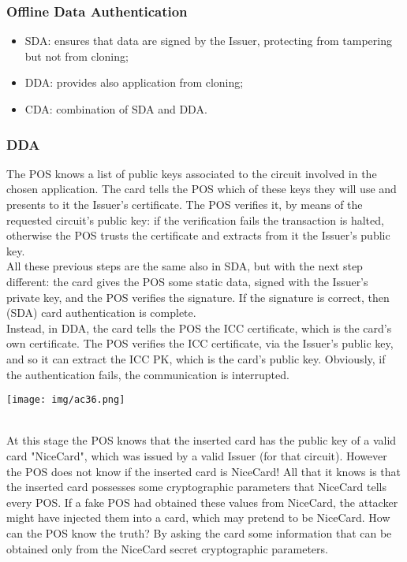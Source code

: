 \documentclass[a4paper, 10pt, titlepage]{article}
\begin{document}
\subsubsection{Offline Data Authentication}
\begin{itemize}
\item SDA: ensures that data are signed by the Issuer, protecting from tampering but not from cloning;
\item DDA: provides also application from cloning;
\item CDA: combination of SDA and DDA.
\end{itemize}

\subsubsection*{DDA}
\begin{minipage}{0.5\textwidth}
The POS knows a list of public keys associated to the circuit involved in the chosen application. The card tells the POS which of these keys they will use and presents to it the Issuer's certificate.
The POS verifies it, by means of the requested circuit's public key: if the verification fails the transaction is halted, otherwise the POS trusts the certificate and extracts from it the Issuer's public key. \\
All these previous steps are the same also in SDA, but with the next step different: the card gives the POS some static data, signed with the Issuer's private key, and the POS verifies the signature. If the signature is correct, then (SDA) card authentication is complete. \\
Instead, in DDA, the card tells the POS the ICC certificate, which is the card's own certificate. The POS verifies the ICC certificate, via the Issuer's public key, and so it can extract the ICC PK, which is the card's public key. Obviously, if the authentication fails, the communication is interrupted.
\end{minipage}
\hfill
\begin{minipage}{0.4\textwidth}
\begin{center}
\texttt{[image: img/ac36.png]}
\end{center}
\end{minipage} \medskip\\
At this stage the POS knows that the inserted card has the public key of a valid card "NiceCard", which was issued by a valid Issuer (for that circuit).
However the POS does not know if the inserted card is NiceCard! All that it knows is that the inserted card possesses some cryptographic parameters that NiceCard tells every POS. If a fake POS had obtained these values from NiceCard, the attacker might have injected them into a card, which may pretend to be NiceCard. How can the POS know the truth? By asking the card some information that can be obtained only from the NiceCard secret cryptographic parameters.\\
\end{document}
